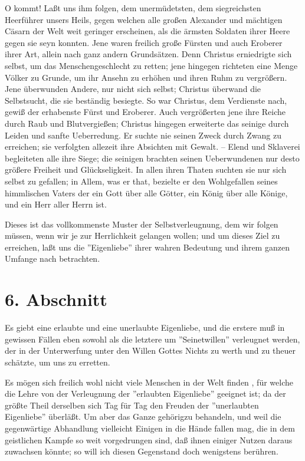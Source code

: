O kommt! Laßt uns ihm folgen, dem unermüdetsten, dem siegreichsten Heerführer
unsers Heils, gegen welchen alle großen Alexander und mächtigen Cäsarn der Welt
weit geringer erscheinen, als die ärmsten Soldaten ihrer Heere gegen sie seyn
konnten. Jene waren freilich große Fürsten und auch Eroberer ihrer Art, allein
nach ganz andern Grundsätzen. Denn Christus erniedrigte sich selbst, um das
Menschengeschlecht zu retten; jene hingegen richteten eine Menge Völker zu
Grunde, um ihr Ansehn zu erhöhen und ihren Ruhm zu vergrößern. Jene überwunden
Andere, nur nicht sich selbst; Christus überwand die Selbstsucht, die sie
beständig besiegte. So war Christus, dem Verdienste nach, gewiß der erhabenste
Fürst und Eroberer. Auch vergrößerten jene ihre Reiche durch Raub und
Blutvergießen; Christus hingegen erweiterte das seinige durch Leiden und sanfte
Ueberredung. Er suchte nie seinen Zweck durch Zwang zu erreichen; sie verfolgten
allezeit ihre Absichten mit Gewalt. -- Elend und Sklaverei begleiteten alle ihre
Siege; die seinigen brachten seinen Ueberwundenen nur desto größere Freiheit und
Glückseligkeit. In allen ihren Thaten suchten sie nur sich selbst zu gefallen;
in Allem, was er that, bezielte er den Wohlgefallen seines himmlischen Vaters
der ein Gott über alle Götter, ein König über alle Könige, und ein Herr aller
Herrn ist.

Dieses ist das vollkommenste Muster der Selbstverleugnung, dem wir folgen
müssen, wenn wir je zur Herrlichkeit gelangen wollen; und um dieses Ziel zu
erreichen, laßt uns die ''Eigenliebe'' ihrer wahren Bedeutung und ihrem ganzen
Umfange nach betrachten.

\section{6. Abschnitt}

Es giebt eine erlaubte und eine unerlaubte Eigenliebe, und die erstere muß in
gewissen Fällen eben sowohl als die letztere um ''Seinetwillen'' verleugnet
werden, der in der Unterwerfung unter den Willen Gottes Nichts zu werth und zu
theuer schätzte, um uns zu erretten.

Es mögen sich freilich wohl nicht viele Menschen in der Welt finden , für welche
die Lehre von der Verleugnung der ''erlaubten Eigenliebe'' geeignet ist; da der
größte Theil derselben sich Tag für Tag den Freuden der ''unerlaubten
Eigenliebe'' überläßt. Um aber das Ganze gehörigzu behandeln, und weil die
gegenwärtige Abhandlung vielleicht Einigen in die Hände fallen mag, die in dem
geistlichen Kampfe so weit vorgedrungen sind, daß ihnen einiger Nutzen daraus
zuwachsen könnte; so will ich diesen Gegenstand doch wenigstens berühren.


